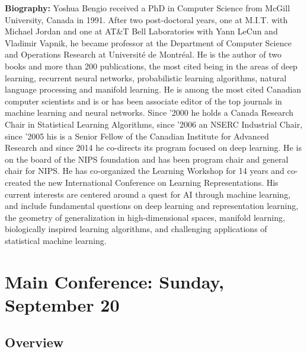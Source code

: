 \vspace{3em}


\vfill{}


\noindent \textbf{Biography:} Yoshua Bengio received a PhD in Computer
Science from McGill University, Canada in 1991. After two post-doctoral
years, one at M.I.T. with Michael Jordan and one at AT\&T Bell Laboratories
with Yann LeCun and Vladimir Vapnik, he became professor at the Department
of Computer Science and Operations Research at Université de Montréal.
He is the author of two books and more than 200 publications, the
most cited being in the areas of deep learning, recurrent neural networks,
probabilistic learning algorithms, natural language processing and
manifold learning. He is among the most cited Canadian computer scientists
and is or has been associate editor of the top journals in machine
learning and neural networks. Since '2000 he holds a Canada Research
Chair in Statistical Learning Algorithms, since '2006 an NSERC Industrial
Chair, since '2005 his is a Senior Fellow of the Canadian Institute
for Advanced Research and since 2014 he co-directs its program focused
on deep learning. He is on the board of the NIPS foundation and has
been program chair and general chair for NIPS. He has co-organized
the Learning Workshop for 14 years and co-created the new International
Conference on Learning Representations. His current interests are
centered around a quest for AI through machine learning, and include
fundamental questions on deep learning and representation learning,
the geometry of generalization in high-dimensional spaces, manifold
learning, biologically inspired learning algorithms, and challenging
applications of statistical machine learning.

\clearpage{}









\chapter{Main Conference: Sunday, September 20}


\section*{Overview}

